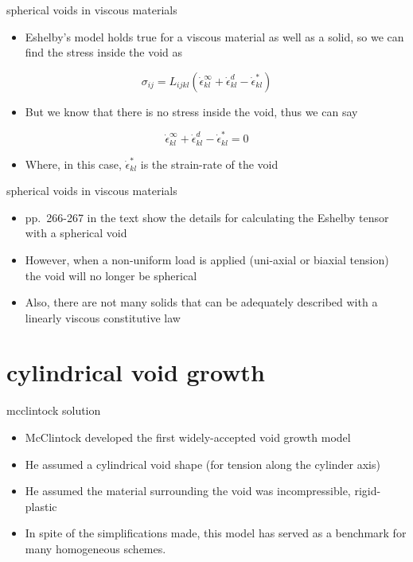 \documentclass[
  letterpaper,
  ignorenonframetext,
  aspectratio=43,
  handout,
  12pt]{beamer}
\providecommand{\tightlist}{%
  \setlength{\itemsep}{0pt}\setlength{\parskip}{0pt}}
\providecommand{\tightlist}{%
\setlength{\itemsep}{0pt}\setlength{\parskip}{0pt}}
\begin{document}
\begin{frame}{spherical voids in viscous materials}
\protect\hypertarget{spherical-voids-in-viscous-materials-1}{}
\begin{itemize}
\tightlist
\item
  Eshelby's model holds true for a viscous material as well as a solid,
  so we can find the stress inside the void as
\end{itemize}

\[\sigma_{ij} = L_{ijkl}\left(\dot{\epsilon}_{kl}^\infty + \dot{\epsilon}_{kl}^d - \dot{\epsilon}_{kl}^*\right)\]

\begin{itemize}
\tightlist
\item
  But we know that there is no stress inside the void, thus we can say
\end{itemize}

\[\dot{\epsilon}_{kl}^\infty + \dot{\epsilon}_{kl}^d - \dot{\epsilon}_{kl}^* = 0\]

\begin{itemize}
\tightlist
\item
  Where, in this case, \(\dot{\epsilon}_{kl}^*\) is the strain-rate of
  the void
\end{itemize}
\end{frame}

\begin{frame}{spherical voids in viscous materials}
\protect\hypertarget{spherical-voids-in-viscous-materials-2}{}
\begin{itemize}
\tightlist
\item
  pp.~266-267 in the text show the details for calculating the Eshelby
  tensor with a spherical void
\item
  However, when a non-uniform load is applied (uni-axial or biaxial
  tension) the void will no longer be spherical
\item
  Also, there are not many solids that can be adequately described with
  a linearly viscous constitutive law
\end{itemize}
\end{frame}

\hypertarget{cylindrical-void-growth}{%
\section{cylindrical void growth}\label{cylindrical-void-growth}}

\begin{frame}{mcclintock solution}
\protect\hypertarget{mcclintock-solution}{}
\begin{itemize}
\tightlist
\item
  McClintock developed the first widely-accepted void growth model
\item
  He assumed a cylindrical void shape (for tension along the cylinder
  axis)
\item
  He assumed the material surrounding the void was incompressible,
  rigid-plastic
\item
  In spite of the simplifications made, this model has served as a
  benchmark for many homogeneous schemes.
\end{itemize}
\end{frame}
\end{document}

